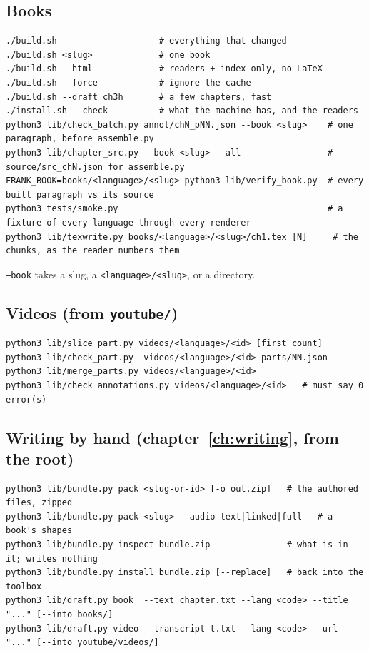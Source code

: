 \documentclass[11pt,oneside]{report}
\newcommand{\file}[1]{\texttt{#1}}
\begin{document}
\subsection*{Books}
\begin{lstlisting}
./build.sh                    # everything that changed
./build.sh <slug>             # one book
./build.sh --html             # readers + index only, no LaTeX
./build.sh --force            # ignore the cache
./build.sh --draft ch3h       # a few chapters, fast
./install.sh --check          # what the machine has, and the readers
python3 lib/check_batch.py annot/chN_pNN.json --book <slug>    # one paragraph, before assemble.py
python3 lib/chapter_src.py --book <slug> --all                 # source/src_chN.json for assemble.py
FRANK_BOOK=books/<language>/<slug> python3 lib/verify_book.py  # every built paragraph vs its source
python3 tests/smoke.py                                         # a fixture of every language through every renderer
python3 lib/texwrite.py books/<language>/<slug>/ch1.tex [N]     # the chunks, as the reader numbers them
\end{lstlisting}

\texttt{--book} takes a slug, a \texttt{<language>/<slug>}, or a directory.

\subsection*{Videos (from \file{youtube/})}
\begin{lstlisting}
python3 lib/slice_part.py videos/<language>/<id> [first count]
python3 lib/check_part.py  videos/<language>/<id> parts/NN.json
python3 lib/merge_parts.py videos/<language>/<id>
python3 lib/check_annotations.py videos/<language>/<id>   # must say 0 error(s)
\end{lstlisting}

\subsection*{Writing by hand (chapter~\ref{ch:writing}, from the root)}
\begin{lstlisting}
python3 lib/bundle.py pack <slug-or-id> [-o out.zip]   # the authored files, zipped
python3 lib/bundle.py pack <slug> --audio text|linked|full   # a book's shapes
python3 lib/bundle.py inspect bundle.zip               # what is in it; writes nothing
python3 lib/bundle.py install bundle.zip [--replace]   # back into the toolbox
python3 lib/draft.py book  --text chapter.txt --lang <code> --title "..." [--into books/]
python3 lib/draft.py video --transcript t.txt --lang <code> --url "..." [--into youtube/videos/]
\end{lstlisting}
\end{document}
